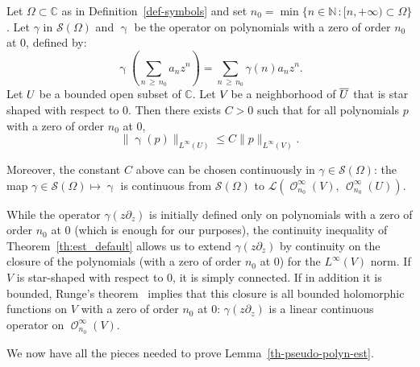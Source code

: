 \documentclass[AHL,Unicode,longabstracts,published]{cedram}
\renewcommand{\leq}{\leqslant}
\renewcommand{\geq}{\geqslant}
\newcommand{\1}{\mathds 1}
\DeclareMathOperator{\Hol}{\mathcal O}
\newcommand{\C}{\mathbb{C}}
\newcommand{\N}{\mathbb{N}}
\newcommand{\Lc}{{\mathcal L}}
\newcommand{\Sc}{{\mathcal S}}
\newcommand{\Op}[1]{\mathop{#1(z\partial_z)}}
\newcommand*{\noic}{\sb{}\kern-\scriptspace }
\begin{document}
\begin{theo}\label{th:est_default}
Let $\Omega\subset \C$ as in Definition~\ref{def-symbols} and set $n_0 = \min\{n\in\N\, : [n,+\infty) \subset \Omega\}$. Let $\gamma$ in $\Sc(\Omega)$ and $\Op{\gamma}$ be the operator on polynomials with a zero of order $n_0$ at $0$, defined by:
\[
\Op{\gamma}\left(\sum_{n\,\geq\,n_0} a_n z^n\right) = \sum_{n\,\geq\,n_0} \gamma(n) a_n z^n.
\]
Let $U\noic$ be a bounded open subset of $\C$. Let $V\noic$ be a neighborhood of $\overline U\noic$ that is star shaped with respect to $0$. Then there exists $C>0$ such that for all polynomials $p$ with a zero of order $n_0$ at $0$,
\[
\lVert\Op{\gamma}(p)\rVert_{L^\infty(U)}\leq C\|p\|_{L^\infty(V)}.
\]

Moreover, the constant $C$ above can be chosen continuously in $\gamma\in \Sc(\Omega)$: the map $\gamma\in \Sc(\Omega) \mapsto \Op{\gamma}$ is continuous from $\Sc(\Omega)$ to $\Lc(\Hol^\infty_{n_0}(V),\, \Hol^\infty_{n_0}(U))$.
\end{theo}

\begin{rema}
While the operator $\gamma(z\partial_z)$ is initially defined only on polynomials with a zero of order $n_0$ at $0$ (which is enough for our purposes), the continuity inequality of Theorem~\ref{th:est_default} allows us to extend $\gamma(z\partial_z)$ by continuity on the closure of the polynomials (with a zero of order $n_0$ at $0$) for the $L^\infty(V)$ norm. If $V$ is star-shaped with respect to $0$, it is simply connected. If in addition it is bounded, Runge's theorem~\cite[Theorem~13.9]{Rudin86} implies that this closure is all bounded holomorphic functions on $V$ with a zero of order $n_0$ at $0$: $\gamma(z\partial_z)$ is a linear continuous operator on $\Hol^\infty_{n_0}(V)$.
\end{rema}

We now have all the pieces needed to prove Lemma~\ref{th-pseudo-polyn-est}.
\end{document}
